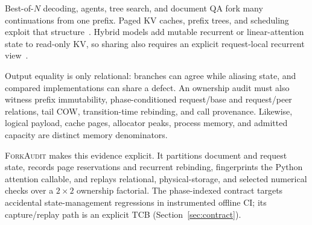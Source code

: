 \documentclass{article}
\newcommand{\method}{\textsc{ForkAudit}}
\begin{document}
Best-of-$N$ decoding, agents, tree search, and document QA fork many
continuations from one prefix.  Paged KV caches, prefix trees, and scheduling
exploit that structure~\citep{kwon2023pagedattention,zheng2024sglang,
gim2024promptcache,srivatsa2025preble}.  Hybrid models add mutable recurrent or
linear-attention state to read-only KV, so sharing also requires an explicit
request-local recurrent view~\citep{yang2025gateddeltanet,lieber2025jamba,
pan2025marconi}.

Output equality is only relational: branches can agree while aliasing state,
and compared implementations can share a defect.  An ownership audit must also
witness prefix immutability, phase-conditioned request/base and request/peer
relations, tail COW, transition-time rebinding, and call provenance.  Likewise,
logical payload, cache pages, allocator peaks, process memory, and admitted
capacity are distinct memory denominators.

\method{} makes this evidence explicit.  It partitions document and request
state, records page reservations and recurrent rebinding, fingerprints the
Python attention callable, and replays relational, physical-storage, and
selected numerical checks over a $2\times2$ ownership factorial.  The
phase-indexed contract targets accidental state-management regressions in
instrumented offline CI; its capture/replay path is an explicit TCB
(Section~\ref{sec:contract}).
\end{document}
